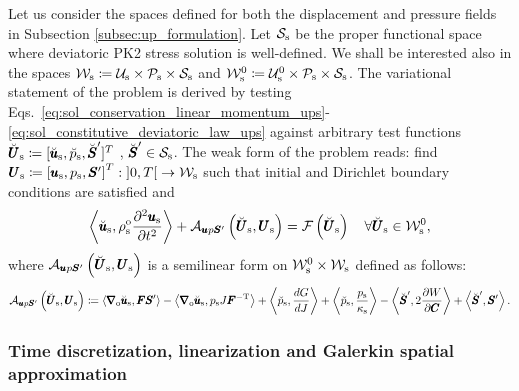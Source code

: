 \documentclass[11pt,english]{article}
\def\usolid{\pmb{u}_{\rm{s}}}                   %
\def\psolid{p_{\rm{s}}}                         %
\def\devPK{\pmb{S}^\prime}                      %
\def\unknosolid{\pmb{U}_{\rm{s}}}               %
\def\usolidspace{\mathcal{U}_{\rm{s}}}          %
\def\psolidspace{\mathcal{P}_{\rm{s}}}          %
\def\devPKspace{\mathcal{S}_{\rm{s}}}           %
\def\unknosolidspace{\mathcal{W}_{\rm{s}}}      %
\def\testusolid{\breve{\pmb{u}}_{\rm{s}}}       %
\def\testpsolid{\breve{p}_{\rm{s}}}             %
\def\testdevPK{\breve{\pmb{S}}^\prime}          %
\def\testsolid{\breve{\pmb{U}}_{\rm{s}}}        %
\def\testusolidspace{\mathcal{U}_{\rm{s}}^0}    %
\def\testsolidspace{\mathcal{W}_{\rm{s}}^0}     %
\def\F{\pmb{F}}                             %
\def\C{\pmb{C}}                             %
\def\invFtrans{\pmb{F}^{-\rm{T}}}           %
\def\dGdJ{\frac{dG}{dJ}}                    %
\def\dWdC{\frac{\partial W}{\partial \C}}   %
\def\grad{\pmb{\nabla}_{\rm{o}}}        %
\def\denssolid{\rho_{\rm{s}}^{\rm{o}}}  %
\def\kappasolid{\kappa_{\rm{s}}}        %
\def\ups{\pmb{u} p \devPK}
\def\timeint{\left ] 0,T\right[}                         %
\def\dudt{\frac{\partial \usolid}{\partial t}}          %
\def\dudt2{\frac{\partial^2 \usolid}{\partial t^2}}     %
\begin{document}
Let us consider the spaces defined for both the displacement and pressure fields in Subsection \ref{subsec:up_formulation}. Let $\devPKspace$ be the proper functional space where deviatoric PK2 stress solution is well-defined. We shall be interested also in the spaces $\unknosolidspace \coloneqq \usolidspace \times \psolidspace \times \devPKspace$ and $\testsolidspace \coloneqq \testusolidspace \times \psolidspace \times \devPKspace$. The variational statement of the problem is derived by testing Eqs.~\eqref{eq:sol_conservation_linear_momentum_ups}-\eqref{eq:sol_constitutive_deviatoric_law_ups} against arbitrary test functions $\testsolid \coloneqq [\testusolid,\testpsolid,\testdevPK]^T$ , $\testdevPK \in \devPKspace$. The weak form of the problem reads: find $\unknosolid \coloneqq \left [ \usolid, \psolid, \devPK \right ]^T : \timeint \rightarrow  \unknosolidspace $ such that initial and Dirichlet boundary conditions are satisfied and
\begin{equation*}
     \left \langle \testusolid, \denssolid \dudt2 \right \rangle + \mathcal{A}_{\ups} \left ( \testsolid, \unknosolid \right) = \mathcal{F} \left ( \testsolid  \right) \quad \forall \testsolid \in \testsolidspace,
\end{equation*}
where $\mathcal{A}_{\ups} \left ( \testsolid, \unknosolid \right)$ is a semilinear form on $\testsolidspace \times \unknosolidspace$ defined as follows:
\begin{alignat*}{1}
    \mathcal{A}_{\ups} \left ( \testsolid, \unknosolid \right)  
    \coloneqq \left \langle \grad \testusolid,  \F \devPK \right \rangle  
    - \left \langle \grad \testusolid ,  \psolid J \invFtrans \right \rangle 
    + \left \langle \testpsolid , \dGdJ \right \rangle 
    + \left \langle \testpsolid , \frac{\psolid}{\kappasolid} \right \rangle 
    - \left \langle \testdevPK , 2\dWdC \right \rangle 
    + \left \langle \testdevPK , \devPK \right \rangle .
\end{alignat*}

\subsubsection{Time discretization, linearization and Galerkin spatial approximation\label{subsubsec:ups_formulation_time_space_linearization}}
\end{document}
